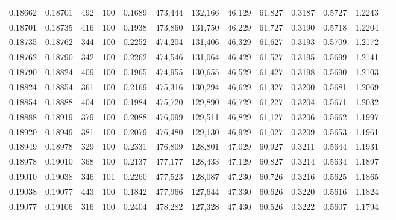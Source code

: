 \begin{tabular}{rrrrrrrrrrrrr}
0.18662 & 0.18701 &   492 & 100 &                                     0.1689 & 473,444 & 132,166 &  46,129 &  61,827 & 0.3187 & 0.5727 & 1.2243 \\
0.18701 & 0.18735 &   416 & 100 &                                     0.1938 & 473,860 & 131,750 &  46,229 &  61,727 & 0.3190 & 0.5718 & 1.2204 \\
0.18735 & 0.18762 &   344 & 100 &                                     0.2252 & 474,204 & 131,406 &  46,329 &  61,627 & 0.3193 & 0.5709 & 1.2172 \\
0.18762 & 0.18790 &   342 & 100 &                                     0.2262 & 474,546 & 131,064 &  46,429 &  61,527 & 0.3195 & 0.5699 & 1.2141 \\
0.18790 & 0.18824 &   409 & 100 &                                     0.1965 & 474,955 & 130,655 &  46,529 &  61,427 & 0.3198 & 0.5690 & 1.2103 \\
0.18824 & 0.18854 &   361 & 100 &                                     0.2169 & 475,316 & 130,294 &  46,629 &  61,327 & 0.3200 & 0.5681 & 1.2069 \\
0.18854 & 0.18888 &   404 & 100 &                                     0.1984 & 475,720 & 129,890 &  46,729 &  61,227 & 0.3204 & 0.5671 & 1.2032 \\
0.18888 & 0.18919 &   379 & 100 &                                     0.2088 & 476,099 & 129,511 &  46,829 &  61,127 & 0.3206 & 0.5662 & 1.1997 \\
0.18920 & 0.18949 &   381 & 100 &                                     0.2079 & 476,480 & 129,130 &  46,929 &  61,027 & 0.3209 & 0.5653 & 1.1961 \\
0.18949 & 0.18978 &   329 & 100 &                                     0.2331 & 476,809 & 128,801 &  47,029 &  60,927 & 0.3211 & 0.5644 & 1.1931 \\
0.18978 & 0.19010 &   368 & 100 &                                     0.2137 & 477,177 & 128,433 &  47,129 &  60,827 & 0.3214 & 0.5634 & 1.1897 \\
0.19010 & 0.19038 &   346 & 101 &                                     0.2260 & 477,523 & 128,087 &  47,230 &  60,726 & 0.3216 & 0.5625 & 1.1865 \\
0.19038 & 0.19077 &   443 & 100 &                                     0.1842 & 477,966 & 127,644 &  47,330 &  60,626 & 0.3220 & 0.5616 & 1.1824 \\
0.19077 & 0.19106 &   316 & 100 &                                     0.2404 & 478,282 & 127,328 &  47,430 &  60,526 & 0.3222 & 0.5607 & 1.1794 \\

\end{tabular}
